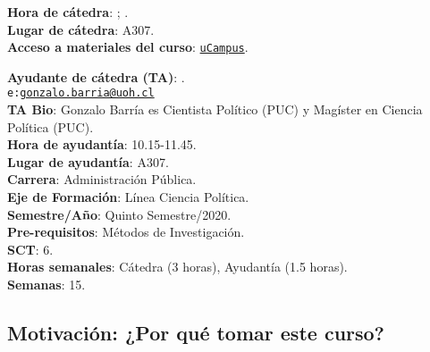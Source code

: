 \documentclass[letterpaper]{article}
\begin{document}
\vspace{5mm}
{\bf Hora de c\'atedra}: {\unskip}; {\unskip}.\\
{\bf Lugar de c\'atedra}: A307.\\
{\bf Acceso a materiales del curso}: \href{https://ucampus.uoh.cl/uoh/2019/2/AP2107/1/}{\texttt{uCampus}}.

\vspace{5mm}
{\bf Ayudante de c\'atedra (TA)}: {\unskip}.\\
\texttt{e:}\href{mailto:gonzalo.barria@uoh.cl}{\texttt{gonzalo.barria@uoh.cl}}\\
{\bf TA Bio}: Gonzalo Barr\'ia es Cientista Pol\'itico (PUC) y Mag\'ister en Ciencia Pol\'itica (PUC).\\
{\bf Hora de ayudant\'ia}: 10.15-11.45.\\
{\bf Lugar de ayudant\'ia}: A307.\\

\vspace{5mm}
{\bf Carrera}:	Administraci\'on P\'ublica.\\
{\bf Eje de Formaci\'on}: L\'inea Ciencia Pol\'itica.\\
{\bf Semestre/A\~no}:	Quinto Semestre/2020.\\
{\bf Pre-requisitos}: M\'etodos de Investigaci\'on.\\
{\bf SCT}: 6.\\
{\bf Horas semanales}: C\'atedra (3 horas), Ayudant\'ia	(1.5 horas).\\
{\bf Semanas}:	15.\\



\subsection*{Motivaci\'on: ¿Por qu\'e tomar este curso?}
\end{document}
